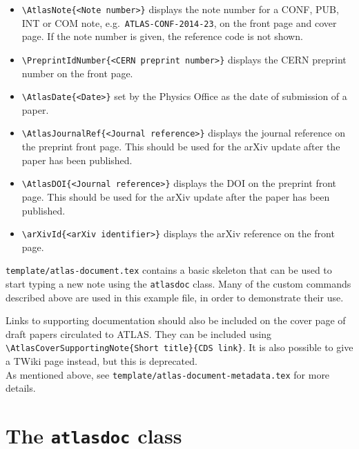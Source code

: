 \begin{itemize}
  \item {\verb|\AtlasNote{<Note number>}|} displays the note number
    for a CONF, PUB, INT or COM note, e.g.\ \texttt{ATLAS-CONF-2014-23},
    on the front page and cover page.
    If the note number is given, the reference code is not shown.

  \item {\verb|\PreprintIdNumber{<CERN preprint number>}|} displays the CERN
    preprint number on the front page.
    
  \item {\verb|\AtlasDate{<Date>}|} set by the Physics Office as the date of submission of a paper.

  \item {\verb|\AtlasJournalRef{<Journal reference>}|} displays the journal reference
    on the preprint front page.
    This should be used for the arXiv update after the paper has been published.

  \item {\verb|\AtlasDOI{<Journal reference>}|} displays the DOI
    on the preprint front page.
    This should be used for the arXiv update after the paper has been published.

  \item {\verb|\arXivId{<arXiv identifier>}|} displays the arXiv reference
    on the front page.

\end{itemize}
%
\texttt{template/atlas-document.tex} contains a basic skeleton that can be
used to start typing a new note using the \texttt{atlasdoc} class. Many of
the custom commands described above are used in this example file, in
order to demonstrate their use.

Links to supporting documentation should also be included on the cover page of draft papers circulated to ATLAS.
They can be included using
\verb|\AtlasCoverSupportingNote{Short title}{CDS link}|.
It is also possible to give a TWiki page instead, but this is deprecated.\\
As mentioned above, see \texttt{template/atlas-document-metadata.tex} for more details.


\section{The \texttt{atlasdoc} class}
\label{app:atlasdoc}

